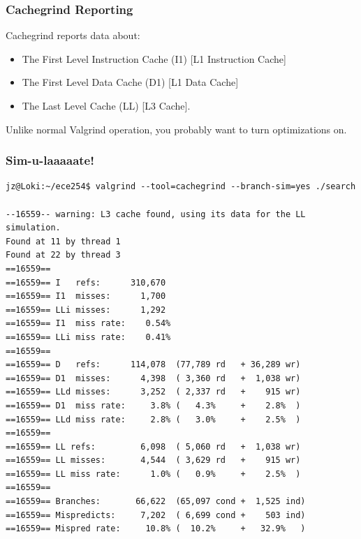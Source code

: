 \begin{frame}
\frametitle{Cachegrind Reporting}

Cachegrind reports data about:
\begin{itemize}
	\item The First Level Instruction Cache (I1) [L1 Instruction Cache]
	\item The First Level Data Cache (D1) [L1 Data Cache]
	\item The Last Level Cache (LL) [L3 Cache].
\end{itemize}

Unlike normal Valgrind operation, you probably want to turn optimizations on.

\end{frame}

\begin{frame}[fragile]
\frametitle{Sim-u-laaaaate!}
{\scriptsize

\begin{verbatim}
jz@Loki:~/ece254$ valgrind --tool=cachegrind --branch-sim=yes ./search

--16559-- warning: L3 cache found, using its data for the LL simulation.
Found at 11 by thread 1 
Found at 22 by thread 3 
==16559== 
==16559== I   refs:      310,670
==16559== I1  misses:      1,700
==16559== LLi misses:      1,292
==16559== I1  miss rate:    0.54%
==16559== LLi miss rate:    0.41%
==16559== 
==16559== D   refs:      114,078  (77,789 rd   + 36,289 wr)
==16559== D1  misses:      4,398  ( 3,360 rd   +  1,038 wr)
==16559== LLd misses:      3,252  ( 2,337 rd   +    915 wr)
==16559== D1  miss rate:     3.8% (   4.3%     +    2.8%  )
==16559== LLd miss rate:     2.8% (   3.0%     +    2.5%  )
==16559== 
==16559== LL refs:         6,098  ( 5,060 rd   +  1,038 wr)
==16559== LL misses:       4,544  ( 3,629 rd   +    915 wr)
==16559== LL miss rate:      1.0% (   0.9%     +    2.5%  )
==16559== 
==16559== Branches:       66,622  (65,097 cond +  1,525 ind)
==16559== Mispredicts:     7,202  ( 6,699 cond +    503 ind)
==16559== Mispred rate:     10.8% (  10.2%     +   32.9%   )

\end{verbatim}
}

\end{frame}

